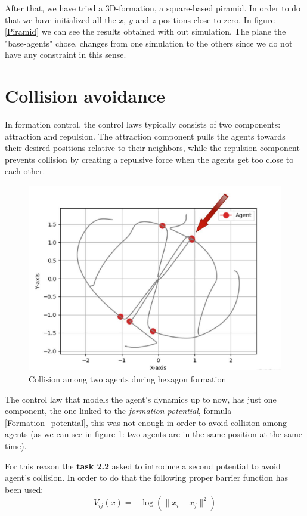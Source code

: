 \documentclass[a4paper,11pt,oneside]{book}
\begin{document}
After that, we have tried a 3D-formation, a square-based piramid. In order to do that we have initialized all the $x$, $y$ and $z$ positions close to zero. In figure \ref{Piramid} we can see the results obtained with out simulation. The plane the "base-agents" chose, changes from one simulation to the others since we do not have any constraint in this sense.


\section{Collision avoidance}
In formation control, the control laws typically consists of two components: attraction and repulsion. The attraction component pulls the agents towards their desired positions relative to their neighbors, while the repulsion component prevents collision by creating a repulsive force when the agents get too close to each other.

\begin{figure}[h]
\centering
	\includegraphics[scale=0.25]{Collision.jpg}
	\caption{Collision among two agents during hexagon formation}
	\label{Collision}
\end{figure}

The control law that models the agent's dynamics up to now, has just one component, the one linked to the \textit{formation potential}, formula \ref{Formation_potential}, this was not enough in order to avoid collision among agents (as we can see in figure \ref{Collision}: two agents are in the same position at the same time). 

\bigskip
For this reason the \textbf{task 2.2} asked to introduce a second potential to avoid agent's collision. In order to do that the following proper barrier function has been used:
\begin{equation}
V_{ij}(x) = - \log( \lVert x_i - x_j \rVert ^2)
\label{Collision_barrier}
\end{equation}
\end{document}
